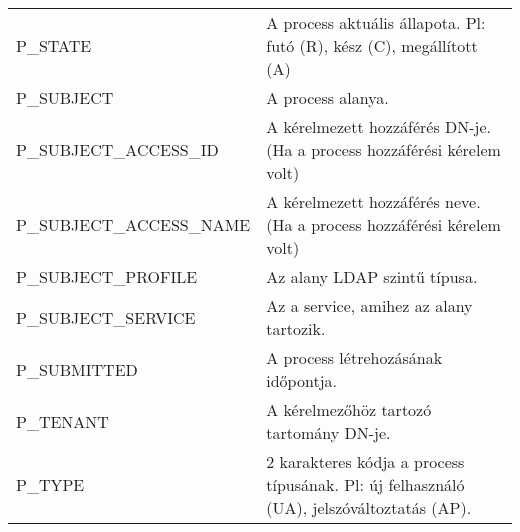 \begin{table}[b]
\begin{tabular}{lp{10cm}}
	P\_STATE & A process aktuális állapota. Pl: futó (R), kész (C), megállított (A) \\
	P\_SUBJECT & A process alanya. \\
	P\_SUBJECT\_ACCESS\_ID & A kérelmezett hozzáférés DN-je. (Ha a process hozzáférési kérelem volt) \\
	P\_SUBJECT\_ACCESS\_NAME & A kérelmezett hozzáférés neve. (Ha a process hozzáférési kérelem volt) \\
	P\_SUBJECT\_PROFILE & Az alany LDAP szintű típusa. \\
	P\_SUBJECT\_SERVICE & Az a service, amihez az alany tartozik. \\
	P\_SUBMITTED & A process létrehozásának időpontja. \\
	P\_TENANT & A kérelmezőhöz tartozó tartomány DN-je. \\
	P\_TYPE & 2 karakteres kódja a process típusának. Pl: új felhasználó (UA), jelszóváltoztatás (AP). \\
		
	\end{tabular}
\end{table}
